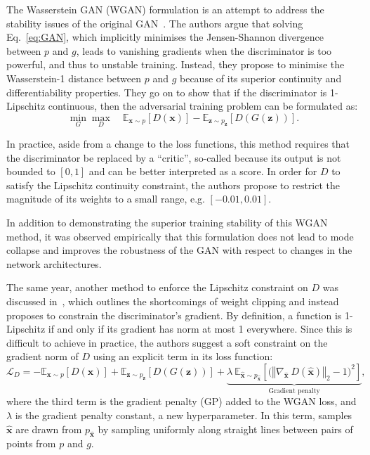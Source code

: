 The Wasserstein GAN (WGAN) formulation is an attempt to address the stability issues of the original GAN~\cite{arjovsky2017wasserstein}. The authors argue that solving Eq.~\ref{eq:GAN}, which implicitly minimises the Jensen-Shannon divergence between $p$ and $g$, leads to vanishing gradients when the discriminator is too powerful, and thus to unstable training.
Instead, they propose to minimise the Wasserstein-1 distance between $p$ and $g$ because of its superior continuity and differentiability properties. They go on to show that if the discriminator is 1-Lipschitz continuous, then the adversarial training problem can be formulated as:
\begin{equation}
    \min_G \max_D \quad 
        \mathbb{E}_{\mathbf{x} \sim p} \left[ D(\mathbf{x}) \right] - 
        \mathbb{E}_{\mathbf{z} \sim p_\mathbf{z}} \left[ D(G(\mathbf{z})) \right].
\end{equation}

In practice, aside from a change to the loss functions, this method requires that the discriminator be replaced by a ``critic'', so-called because its output is not bounded to $[0, 1]$ and can be better interpreted as a score. In order for $D$ to satisfy the Lipschitz continuity constraint, the authors propose to restrict the magnitude of its weights to a small range, e.g. $[-0.01, 0.01]$.

In addition to demonstrating the superior training stability of this WGAN method, it was observed empirically that this formulation does not lead to mode collapse and improves the robustness of the GAN with respect to changes in the network architectures.

The same year, another method to enforce the Lipschitz constraint on $D$ was discussed in~\cite{NIPS2017_892c3b1c}, which outlines the shortcomings of weight clipping and instead proposes to constrain the discriminator's gradient.
By definition, a function is 1-Lipschitz if and only if its gradient has norm at most 1 everywhere. Since this is difficult to achieve in practice, the authors suggest a soft constraint on the gradient norm of $D$ using an explicit term in its loss function:
\begin{equation}\label{eq:WGAN-GP}
    \mathcal{L}_D = 
        -\mathbb{E}_{\mathbf{x} \sim p} \left[ D(\mathbf{x}) \right] +
        \mathbb{E}_{\mathbf{z} \sim p_\mathbf{z}} \left[ D(G(\mathbf{z})) \right] +
        \underbrace{\lambda\ \mathbb{E}_{\hat{\mathbf{x}} \sim p_{\hat{\mathbf{x}}}}
            \left[ \big( \left\Vert \nabla_{\hat{\mathbf{x}}}\ D(\hat{\mathbf{x}}) \right\Vert_2 - 1 \big) ^2 \right]}_\textrm{Gradient penalty},
\end{equation}
where the third term is the gradient penalty (GP) added to the WGAN loss, and $\lambda$ is the gradient penalty constant, a new hyperparameter. In this term, samples $\hat{\mathbf{x}}$ are drawn from $p_{\hat{\mathbf{x}}}$ by sampling uniformly along straight lines between pairs of points from $p$ and $g$. 

